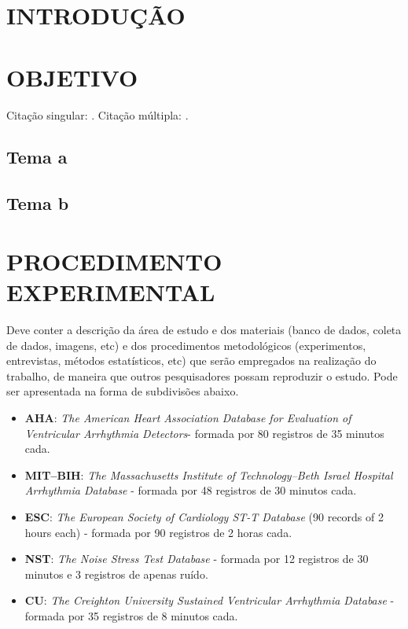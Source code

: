 \chapter{INTRODUÇÃO}
\label{chap:introduction}

\lipsum[1-2]

\chapter{OBJETIVO}
\label{chap:objetive}

Citação singular: \cite{gupta2012cooperative}. Citação múltipla: \cite{perez2016multi, macharet2016autonomous}.

\section{Tema a}

\lipsum[1]

\section{Tema b}

\lipsum[1]

\chapter{PROCEDIMENTO EXPERIMENTAL} 
\label{chap:methodology}

Deve conter a descrição da área de estudo e dos materiais (banco de dados, coleta de dados, imagens, etc) e dos procedimentos metodológicos (experimentos, entrevistas, métodos estatísticos, etc) que serão empregados na realização do trabalho, de maneira que outros pesquisadores possam reproduzir o estudo. Pode ser apresentada na forma de subdivisões abaixo.

\begin{itemize}
	\item \large \textbf{AHA}: \large \textit{The American Heart Association Database for Evaluation of Ventricular Arrhythmia Detectors}- formada por 80 registros de 35 minutos cada.
	\item \large \textbf{MIT–BIH}: \large \textit{The Massachusetts Institute of Technology–Beth Israel Hospital Arrhythmia Database} - formada por 48 registros de 30 minutos cada.
	\item \large \textbf{ESC}: \large \textit{The European Society of Cardiology ST-T Database} (90 records of 2 hours each) - formada por 90 registros de 2 horas cada.
	\item \large \textbf{NST}: \large \textit{The Noise Stress Test Database} - formada por 12 registros de 30 minutos e 3 registros de apenas ruído.
	\item \large \textbf{CU}: \large \textit{The Creighton University Sustained Ventricular Arrhythmia Database} - formada por 35 registros de 8 minutos cada.
\end{itemize}

